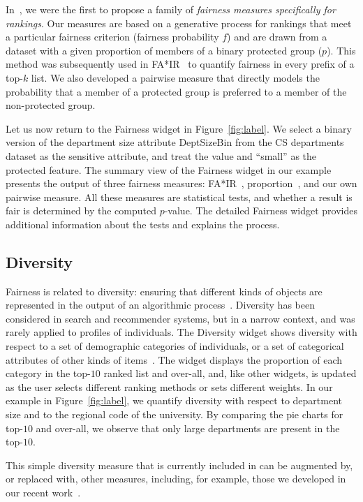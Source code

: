 In~\cite{DBLP:conf/ssdbm/YangS17}, we were the first to propose a family of {\em fairness measures specifically for rankings}.  Our measures are based on a generative process for rankings that meet a particular fairness criterion (fairness probability $f$) and are drawn from a dataset with a given proportion of members of a binary protected group ($p$). This method was subsequently used in FA*IR~\cite{DBLP:conf/cikm/ZehlikeB0HMB17} to quantify fairness in every prefix of a top-$k$ list.  We also developed a pairwise measure that directly models the probability that a member of a protected group is preferred to a member of the non-protected group.

Let us now return to the {\sf Fairness} widget in Figure~\ref{fig:label}.  We select a binary version of the department size attribute {\sf DeptSizeBin} from the CS departments dataset as the sensitive attribute, and treat the value and ``small'' as the protected feature.  The summary view of the {\sf Fairness} widget in our example presents the output of three fairness measures: FA*IR~\cite{DBLP:conf/cikm/ZehlikeB0HMB17}, proportion~\cite{DBLP:journals/datamine/Zliobaite17}, and our own pairwise measure.  All these measures are statistical tests, and whether a result is fair is determined by the computed $p$-value.  The detailed {\sf Fairness} widget provides additional information about the tests and explains the process.

\subsection{Diversity}
\label{sec:sys:div}

Fairness is related to diversity: ensuring that different kinds of objects are represented in the output of an algorithmic process~\cite{diversity}.  Diversity has been considered in search and recommender systems, but in a narrow context, and was rarely applied to profiles of individuals. %
%
The {\sf Diversity} widget  shows diversity with respect to a set of demographic categories of individuals, or a set of categorical attributes of other kinds of items~\cite{diversity}.  The widget displays the proportion of each category in the top-$10$ ranked list and over-all, and, like other widgets, is updated as the user selects different ranking methods or sets different weights.  In our example in Figure~\ref{fig:label}, we quantify diversity with respect to department size and to the regional code of the university.  By comparing the pie charts for top-$10$ and over-all, we observe that only large departments are present in the top-$10$.

This simple diversity measure that is currently included in \rf can be augmented by, or replaced with, other measures, including, for example, those we developed in our recent work~\cite{DBLP:conf/edbt/StoyanovichYJ18,DBLP:conf/ijcai/YangGS19}.

